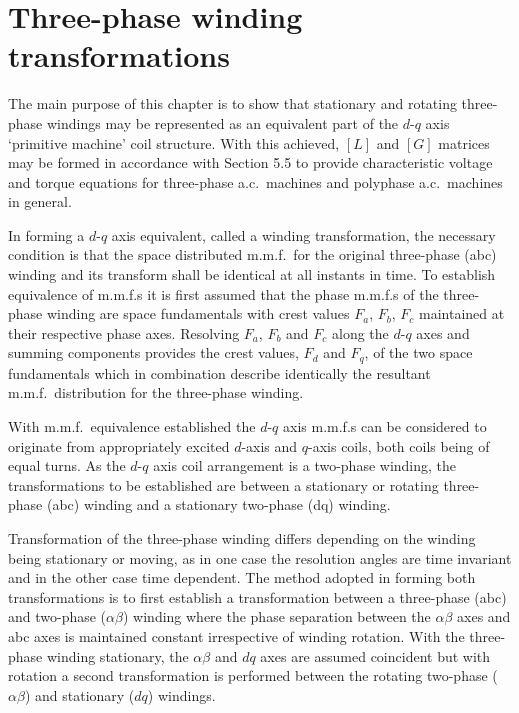 \documentclass[a4paper,numbers=noenddot,12pt]{scrbook}
\begin{document}
    \chapter{Three-phase winding transformations}
    The main purpose of this chapter is to show that stationary and rotating three-phase windings may be represented as an equivalent part of the $d$-$q$ axis `primitive machine' coil structure. With this achieved, $[L]$ and $[G]$ matrices may be formed in accordance with Section 5.5 to provide characteristic voltage and torque equations for three-phase a.c.\ machines and polyphase a.c.\ machines in general.

    In forming  a $d$-$q$ axis equivalent, called a winding transformation, the necessary condition is that the space distributed m.m.f.\ for the original three-phase (abc) winding and its transform shall be identical at all instants in time. To establish equivalence of m.m.f.s it is first assumed that the phase m.m.f.s of the three-phase winding are space fundamentals with crest values $F_a$, $F_b$, $F_c$ maintained at their respective phase axes. Resolving $F_a$, $F_b$ and $F_c$ along
    the $d$-$q$ axes and summing components provides the crest values, $F_d$ and $F_q$, of the two space fundamentals which in combination describe identically the resultant m.m.f.\ distribution for the three-phase winding.

    With m.m.f.\ equivalence established the $d$-$q$ axis m.m.f.s can be considered to originate from appropriately excited $d$-axis and $q$-axis coils, both coils being of equal turns. As the $d$-$q$ axis coil arrangement is a two-phase winding, the transformations to be established are between a stationary or rotating three-phase (abc) winding and a stationary two-phase (dq) winding.

    Transformation of the three-phase winding differs depending on the winding being stationary or moving, as in one case the resolution angles are time invariant and in the other case time dependent. The method adopted in forming both transformations is to first establish a transformation between a three-phase (abc) and two-phase ($\alpha \beta$) winding where the phase separation between the $\alpha \beta$ axes and abc axes is maintained constant irrespective of winding rotation. With
    the three-phase winding stationary, the $\alpha \beta$ and $dq$ axes are assumed coincident but with rotation a second transformation is performed between the rotating two-phase ($\alpha \beta$) and stationary ($dq$) windings.
\end{document}

